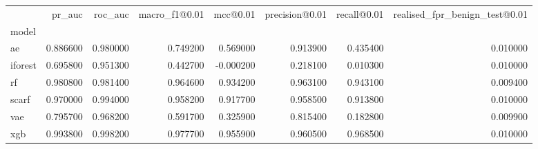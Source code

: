 \begin{tabular}{lrrrrrrr}
\toprule
 & pr_auc & roc_auc & macro_f1@0.01 & mcc@0.01 & precision@0.01 & recall@0.01 & realised_fpr_benign_test@0.01 \\
model &  &  &  &  &  &  &  \\
\midrule
ae & 0.886600 & 0.980000 & 0.749200 & 0.569000 & 0.913900 & 0.435400 & 0.010000 \\
iforest & 0.695800 & 0.951300 & 0.442700 & -0.000200 & 0.218100 & 0.010300 & 0.010000 \\
rf & 0.980800 & 0.981400 & 0.964600 & 0.934200 & 0.963100 & 0.943100 & 0.009400 \\
scarf & 0.970000 & 0.994000 & 0.958200 & 0.917700 & 0.958500 & 0.913800 & 0.010000 \\
vae & 0.795700 & 0.968200 & 0.591700 & 0.325900 & 0.815400 & 0.182800 & 0.009900 \\
xgb & 0.993800 & 0.998200 & 0.977700 & 0.955900 & 0.960500 & 0.968500 & 0.010000 \\
\bottomrule
\end{tabular}
